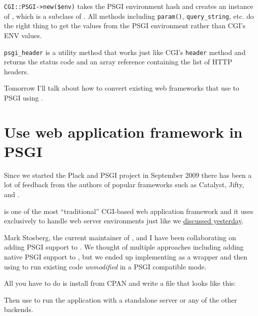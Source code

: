 
\lstinline!CGI::PSGI->new($env)! takes the PSGI environment hash and
creates an instance of , which is a subclass of . All
methods including \lstinline!param()!, \lstinline!query_string!, etc. do
the right thing to get the values from the PSGI environment rather than
CGI's ENV values.

\lstinline!psgi_header! is a utility method that works just like CGI's
\lstinline!header! method and returns the status code and an array
reference containing the list of HTTP headers.

Tomorrow I'll talk about how to convert existing web frameworks that use
 to PSGI using .

\chapter{Use web application framework in
PSGI}\label{day-7-use-web-application-framework-in-psgi}

Since we started the Plack and PSGI project in September 2009 there has
been a lot of feedback from the authors of popular frameworks such as
Catalyst, Jifty, and .

\href{http://cgi-app.org/}{} is one of the most
``traditional'' CGI-based web application framework and it uses 
exclusively to handle web server environments just like we
\href{http://advent.plackperl.org/2009/12/day-6-convert-cgi-apps-to-psgi.html}{discussed
yesterday}.

Mark Stosberg, the current maintainer of , and I have
been collaborating on adding PSGI support to . We
thought of multiple approaches including adding native PSGI support to
, but we ended up implementing
\href{http://search.cpan.org/perldoc?CGI::PSGI}{} as a 
wrapper and then using
\href{http://search.cpan.org/perldoc?CGI::Application::PSGI}{}
to run existing  code \emph{unmodified} in a PSGI
compatible mode.

All you have to do is install  from CPAN and write
a  file that looks like this:


Then use
\href{http://advent.plackperl.org/2009/12/day-3-using-plackup.html}{}
to run the application with a standalone server or any of the other
backends.


